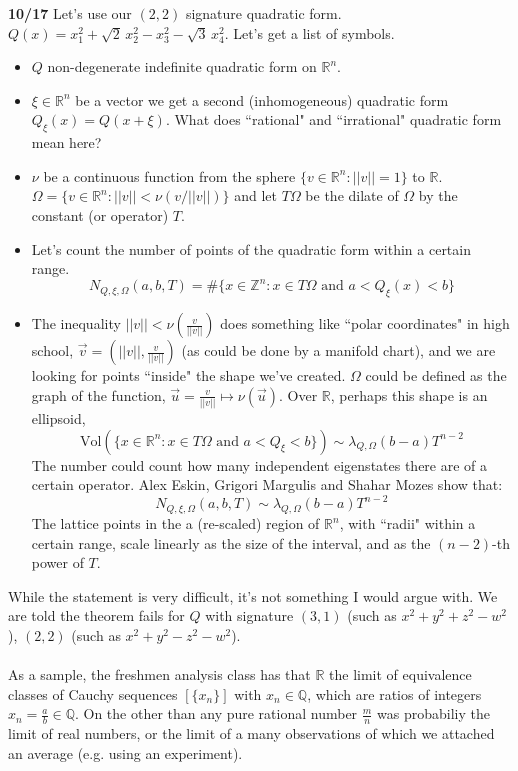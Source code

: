 \documentclass[12pt]{article}
\begin{document}
\noindent \textbf{10/17} Let's use our $(2,2)$ signature quadratic form.  $Q(x) = x_1^2 + \sqrt{2} \, x_2^2 - x_3^2 - \sqrt{3} \, x_4^2 $. Let's get a list of symbols.
\begin{itemize}
\item $Q$ non-degenerate indefinite quadratic form on $\mathbb{R}^n$.  
\item $\xi \in \mathbb{R}^n$ be a vector we get a second (inhomogeneous) quadratic form $Q_\xi(x) = Q(x + \xi)$.  What does ``rational" and ``irrational" quadratic form mean here?  
\item $\nu$ be a continuous function from the sphere $\{ v \in \mathbb{R}^n : ||v|| = 1  \}$ to $\mathbb{R}$.   \\ $\Omega = \{ v \in \mathbb{R}^n: ||v ||  < \nu(v/||v||)   \}   $ and let $T\Omega$ be the dilate of $\Omega$ by the constant (or operator) $T$.
\item Let's count the number of points of the quadratic form within a certain range.  
$$ N_{Q, \xi, \Omega}(a,b,T) = \# \big\{ x \in \mathbb{Z}^n : x \in T\Omega \text{ and } a < Q_\xi(x) < b \big\} $$
\item The inequality $||v|| < \nu(\frac{v}{||v||}) $ does something like ``polar coordinates" in high school, $\vec{v} = ( ||v||, \frac{v}{||v||})$ (as could be done by a manifold chart), and we are looking for points ``inside" the shape we've created.  $\Omega$ could be defined as the graph of the function, $\vec{u} = \frac{v}{||v||} \mapsto \nu(\vec{u})$. Over $\mathbb{R}$, perhaps this shape is an ellipsoid,
$$ \text{Vol} (\{ x \in \mathbb{R}^n : x \in T\Omega  \text{ and } a < Q_\xi < b \})\sim \lambda_{Q, \Omega} (b-a)T^{n-2} $$
The number could count how many independent eigenstates there are of a certain operator.  Alex Eskin, Grigori Margulis and Shahar Mozes show that:
$$ N_{Q, \xi, \Omega}(a,b,T) \sim \lambda_{Q, \Omega} (b-a)T^{n-2}   $$
The lattice points in the a (re-scaled) region of $\mathbb{R}^n$, with ``radii" within a certain range, scale linearly as the size of the interval, and as the $(n-2)$-th power of $T$.  
\end{itemize}
While the statement is very difficult, it's not something I would argue with. We are told the theorem fails for $Q$ with signature $(3,1)$ (such as $x^2 + y^2 + z^2 - w^2$), $(2,2)$ (such as $x^2 + y^2 - z^2 - w^2$).\\ \\
As a sample, the freshmen analysis class has that $\mathbb{R}$ the limit of equivalence classes of Cauchy sequences $[\{ x_n\}]$ with $x_n \in \mathbb{Q}$, which are ratios of integers $x_n = \frac{a}{b} \in \mathbb{Q}$.  On the other than any pure rational number $\frac{m}{n}$ was probabiliy the limit of real numbers, or the limit of a many observations of which we attached an average (e.g. using an experiment). \\ \\
\end{document}
